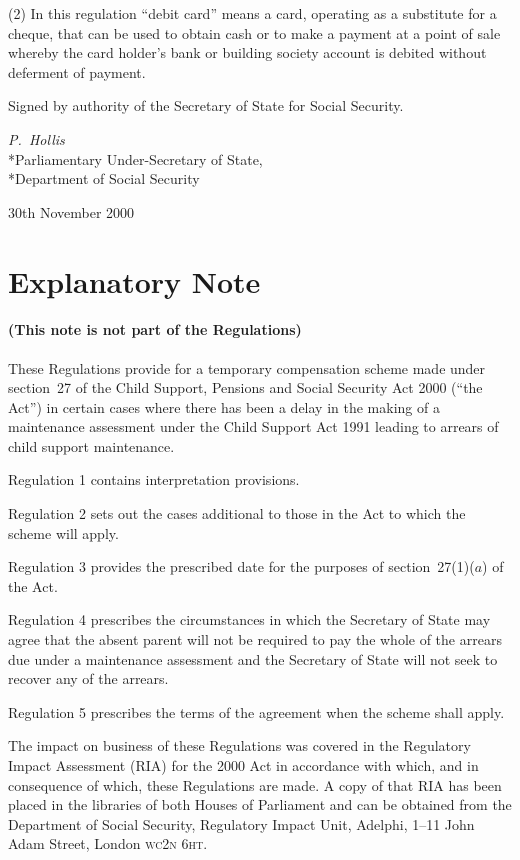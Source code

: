 \documentclass[12pt,a4paper]{article}
\begin{document}
(2) In this regulation “debit card” means a card, operating as a substitute for a cheque, that can be used to obtain cash or to make a payment at a point of sale whereby the card holder’s bank or building society account is debited without deferment of payment. 

\bigskip

Signed 
by authority of the Secretary of State for Social Security.

{\raggedleft
\emph{P.~Hollis}\\*Parliamentary Under-Secretary of State,\\*Department of Social Security

}

30th November 2000

\small

\part{Explanatory Note}

\renewcommand\parthead{--- Explanatory Note}

\subsection*{(This note is not part of the Regulations)}

These Regulations provide for a temporary compensation scheme made under section~27 of the Child Support, Pensions and Social Security Act 2000 (“the Act”) in certain cases where there has been a delay in the making of a maintenance assessment under the Child Support Act 1991 leading to arrears of child support maintenance.

Regulation 1 contains interpretation provisions.

Regulation 2 sets out the cases additional to those in the Act to which the scheme will apply.

Regulation 3 provides the prescribed date for the purposes of section~27(1)($a$)  of the Act.

Regulation 4 prescribes the circumstances in which the Secretary of State may agree that the absent parent will not be required to pay the whole of the arrears due under a maintenance assessment and the Secretary of State will not seek to recover any of the arrears.

Regulation 5 prescribes the terms of the agreement when the scheme shall apply.

The impact on business of these Regulations was covered in the Regulatory Impact Assessment (RIA) for the 2000 Act in accordance with which, and in consequence of which, these Regulations are made. A copy of that RIA has been placed in the libraries of both Houses of Parliament and can be obtained from the Department of Social Security, Regulatory Impact Unit, Adelphi, 1--11 John Adam Street, London \textsc{\lowercase{WC2N 6HT}}.  
\end{document}
